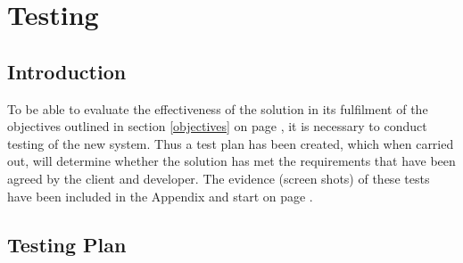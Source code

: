 \chapter{Testing}
\section{Introduction}
To be able to evaluate the effectiveness of the solution in its fulfilment of the objectives outlined in section \ref{objectives} on page \pageref{objectives}, it is necessary to conduct testing of the new system. Thus a test plan has been created, which when carried out, will determine whether the solution has met the requirements that have been agreed by the client and developer. The evidence (screen shots) of these tests have been included in the Appendix and start on page \pageref{appendix}.
\section{Testing Plan}
\footnotesize
